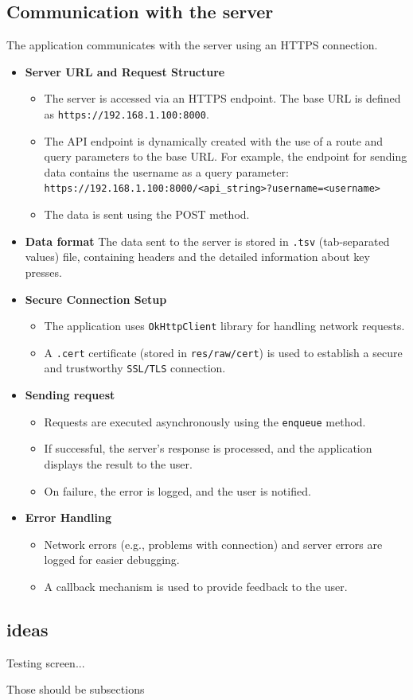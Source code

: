 \subsection{Communication with the server}

The application communicates with the server using an HTTPS connection.
\begin{itemize}
	\item 
	\textbf{Server URL and Request Structure}
	\begin{itemize}
		\item 
		The server is accessed via an HTTPS endpoint. The base URL is defined as \newline \texttt{https://192.168.1.100:8000}.
		\item 
		The API endpoint is dynamically created with the use of a route and query parameters to the base URL. For example, the endpoint for sending data contains the username as a query parameter: \newline
		\texttt{https://192.168.1.100:8000/<api\_string>?username=<username>}
		\item 
		The data is sent using the POST method.
	\end{itemize}
	\item
	\textbf{Data format} \newline
	The data sent to the server is stored in \texttt{.tsv} (tab-separated values) file, containing headers and the detailed information about key presses.
	\item 
	\textbf{Secure Connection Setup}
	\begin{itemize}
		\item 
		The application uses \texttt{OkHttpClient} library for handling network requests.
		\item 
		A \texttt{.cert} certificate (stored in \texttt{res/raw/cert}) is used to establish a secure and trustworthy \texttt{SSL/TLS} connection.
	\end{itemize}
	\item 
	\textbf{Sending request}
	\begin{itemize}
		\item 
		Requests are executed asynchronously using the \texttt{enqueue} method.
		\item 
		If successful, the server's response is processed, and the application displays the result to the user.
		\item 
		On failure, the error is logged, and the user is notified.  
	\end{itemize}
	\item 
	\textbf{Error Handling}
	\begin{itemize}
		\item 
		Network errors (e.g., problems with connection) and server errors are logged for easier debugging.
		\item 
		A callback mechanism is used to provide feedback to the user. 
	\end{itemize}
	
	
\end{itemize}


\subsection{ideas}

Testing screen... 

Those should be subsections